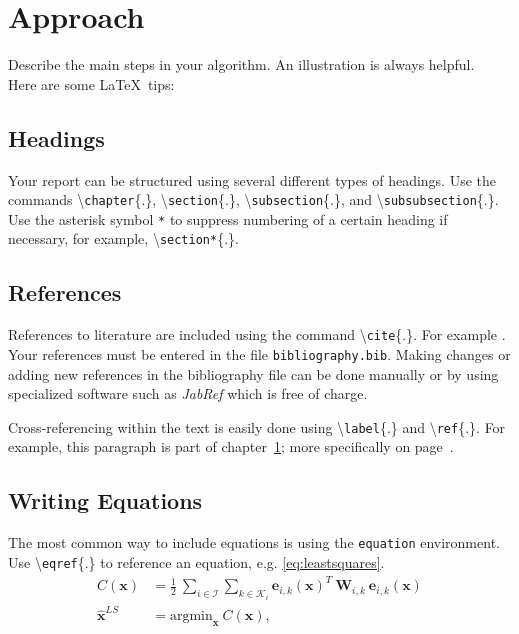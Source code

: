 \chapter{Approach}\label{sec:approach}

Describe the main steps in your algorithm. An illustration is always helpful.\\

Here are some \LaTeX~tips:


\section{Headings}

  Your report can be structured using several different types of headings. Use the commands \textbackslash\texttt{chapter}\{.\}, \textbackslash\texttt{section}\{.\}, \textbackslash\texttt{subsection}\{.\}, and \textbackslash\texttt{subsubsection}\{.\}. Use the asterisk symbol \texttt{*} to suppress numbering of a certain heading if necessary, for example, \textbackslash\texttt{section*}\{.\}.


\section{References}\label{sec:references}

  References to literature are included using the command \textbackslash\texttt{cite}\{.\}. For example \cite{KleinMurray2007,Strasdat2010WhyFilter}. Your references must be entered in the file \texttt{bibliography.bib}. Making changes or adding new references in the bibliography file can be done manually or by using specialized software such as \textit{JabRef} which is free of charge.

  Cross-referencing within the text is easily done using \textbackslash\texttt{label}\{.\} and \textbackslash\texttt{ref}\{.\}. For example, this paragraph is part of chapter~\ref{sec:approach}; more specifically on page~\pageref{sec:references}.

\section{Writing Equations}\label{sec:math}

  The most common way to include equations is using the \texttt{equation} environment. Use \textbackslash\texttt{eqref}\{.\} to reference an equation, e.g. \eqref{eq:leastsquares}.
  \begin{equation}\label{eq:leastsquares}
      \begin{aligned}
        C(\mathbf{x}) &= \frac{1}{2} \ \sum_{i \in \mathcal I} \sum_{k \in \mathcal K_i} \mathbf{e}_{i,k}(\mathbf{x})^T \ \mathbf{W}_{i,k}  \ \mathbf{e}_{i,k}(\mathbf{x})  \\
        \hat{\mathbf{x}}^{LS} &= \text{argmin}_\mathbf{x} \ C(\mathbf{x}),
      \end{aligned}
  \end{equation}

